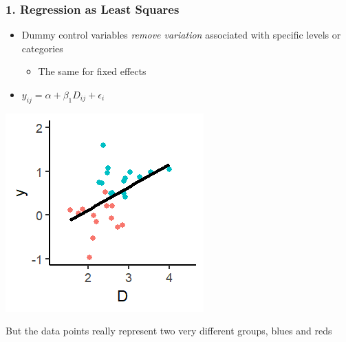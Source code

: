 \documentclass[xcolor=x11names,compress]{beamer}\usepackage[]{graphicx}\usepackage[]{color}
\makeatletter
\def\maxwidth{ %
  \ifdim\Gin@nat@width>\linewidth
    \linewidth
  \else
    \Gin@nat@width
  \fi
}
\newenvironment{knitrout}{}{} %
\renewcommand{\(}{\begin{columns}}
\renewcommand{\)}{\end{columns}}
\newcommand{\<}[1]{\begin{column}{#1}}
\renewcommand{\>}{\end{column}}
\makeatother
\begin{document}
\begin{frame}
\frametitle{1. Regression as Least Squares}
\begin{itemize}
\item Dummy control variables \textit{remove variation} associated with specific levels or categories
\begin{itemize}
\item The same for fixed effects
\end{itemize}
\item $y_{ij} = \alpha + \beta_1 D_{ij} + \epsilon_i$
\end{itemize}
\begin{multicols}{2}
\begin{knitrout}
\color{fgcolor}
\includegraphics[width=\maxwidth]{figure/graph_ols_FE2-1} 

\end{knitrout}
\columnbreak
But the data points really represent two very different groups, blues and reds
\end{multicols}
\end{frame}
\end{document}
